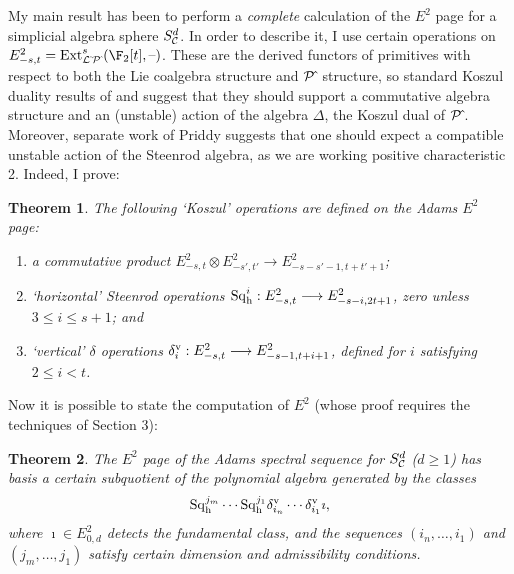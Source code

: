 \documentclass[11pt]{article}
\theoremstyle{plain}
\newtheorem{theorem}{Theorem}
\newcommand{\Sq}{\mathrm{Sq}}
\begin{document}
My main result has been to perform a \emph{complete} calculation of the $E^2$ page for a simplicial algebra sphere $S^d_\calC$. In order to describe it, I use certain operations on $E^2_{-s,t}=\Ext^s_{\calL\hat{\,}\calP\hat{\,}}(\F_2[t],\DASH)$.
These are the derived functors of primitives with respect to both the Lie coalgebra structure and $\calP{\hat\,}$ structure, so standard Koszul duality results of \cite{GinzburgKapranov.pdf} and \cite{PriddyKoszul.pdf} suggest that they should support a commutative algebra structure and an (unstable) action of the algebra $\Delta$, the Koszul dual of $\calP{\hat\,}$. Moreover, separate work of Priddy \cite{PriddySimplicialLie.pdf} suggests that one should expect a compatible unstable action of the Steenrod algebra, as we are working positive characteristic 2. Indeed, I prove:
\begin{theorem}\label{KoszulOperationsDefinedOnE2}
The following `Koszul' operations are defined on the Adams $E^2$ page:
\begin{enumerate}\squishlist
\setlength{\parindent}{.25in}
\item a commutative product $E^2_{-s,t}\otimes E^2_{-s',t'}\to E^2_{-s-s'-1,t+t'+1}$;
\item `horizontal' Steenrod operations $\Sq^i_\textup{h}:E^2_{-s,t}\to E^2_{-s-i,2t+1}$, zero unless $3\leq i\leq s+1$; and
\item `vertical' $\delta$ operations $\delta_i^\textup{v}:E^2_{-s,t}\to E^2_{-s-1,t+i+1}$, defined for $i$ satisfying $2\leq i<t$.
\end{enumerate}
\end{theorem}
\noindent Now it is possible to state the computation of $E^2$ (whose proof requires the techniques of Section 3):
\begin{theorem}\label{AdamsE2PageCalculation}
The $E^2$ page of the Adams spectral sequence for $S^d_\calC$ ($d\geq1$) has basis a certain subquotient of the polynomial algebra generated by the classes
\[\Sq_\textup{h}^{j_m}\cdots \Sq_\textup{h}^{j_1}\delta^\textup{v}_{i_n}\cdots \delta^\textup{v}_{i_1}\imath,\]
where $\imath\in E^2_{0,d}$ detects the fundamental class, and the sequences $(i_n,\ldots,i_1)$ and $(j_m,\ldots,j_1)$ satisfy certain dimension and admissibility conditions. 
\end{theorem}
\end{document}
